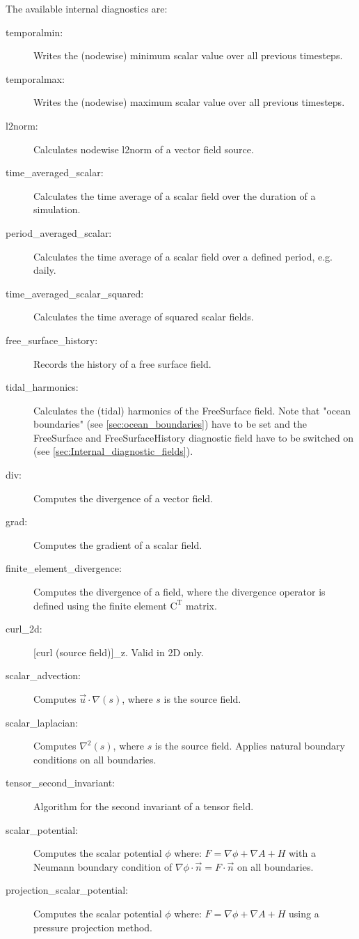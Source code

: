 The available internal diagnostics are:
\begin{description}
\item[temporalmin:]Writes the (nodewise) minimum scalar value over all previous timesteps.
\item[temporalmax:]Writes the (nodewise) maximum scalar value over all previous timesteps.
\item[l2norm:]Calculates nodewise l2norm of a vector field source.
\item[time\_averaged\_scalar:]Calculates the time average of a scalar field over the duration of a simulation.
\item[period\_averaged\_scalar:]Calculates the time average of a scalar field over a defined period, e.g. daily.
\item[time\_averaged\_scalar\_squared:]Calculates the time average of squared scalar fields.
\item[free\_surface\_history:]Records the history of a free surface field.
\item[tidal\_harmonics:]Calculates the (tidal) harmonics of the FreeSurface field. Note that "ocean boundaries" (see \ref{sec:ocean_boundaries}) have to be set and the FreeSurface and FreeSurfaceHistory diagnostic field have to be switched on (see \ref{sec:Internal_diagnostic_fields}).
\item[div:]Computes the divergence of a vector field.
\item[grad:]Computes the gradient of a scalar field.
\item[finite\_element\_divergence:]Computes the divergence of a field, where the divergence operator is defined using the finite element $\mathrm{C}^\mathrm{T}$ matrix.
\item[curl\_2d:][curl (source field)]\_z. Valid in 2D only.
\item[scalar\_advection:]Computes $\vec{u}\cdot\nabla(s)$, where $s$ is the source field.
\item[scalar\_laplacian:]Computes $\nabla^2(s)$, where $s$ is the source field. Applies natural boundary conditions on all boundaries.
\item[tensor\_second\_invariant:]Algorithm for the second invariant of a tensor field.
\item[scalar\_potential:]Computes the scalar potential $\phi$ where: $F = \nabla\phi + \nabla A + H$ with a Neumann boundary condition of $\nabla\phi \cdot \vec{n} = F \cdot \vec{n}$ on all boundaries.
\item[projection\_scalar\_potential:]Computes the scalar potential $\phi$ where: $F = \nabla\phi + \nabla A + H$ using a pressure projection method.

\end{description}
